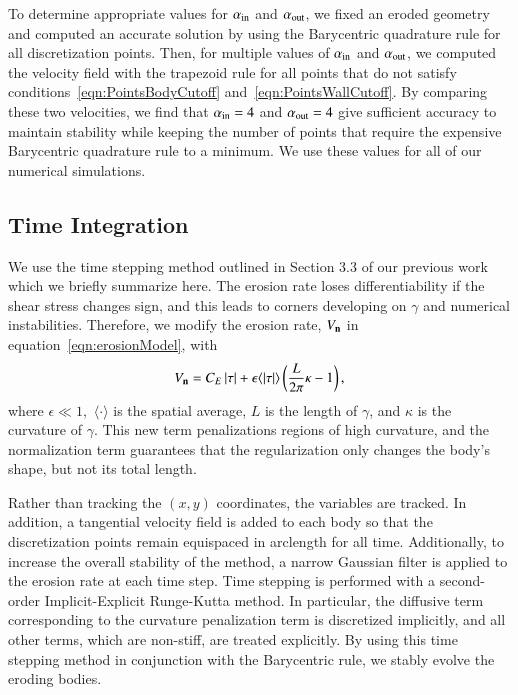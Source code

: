 \documentclass[preprint,10pt]{elsarticle}
\begin{document}
To determine appropriate values for $\alpha_{\mathrm{in}}$ and $\alpha_{\mathrm{out}}$,
we fixed an eroded geometry and computed an accurate solution by using
the Barycentric quadrature rule for all discretization points.  Then,
for multiple values of $\alpha_{\mathrm{in}}$ and $\alpha_{\mathrm{out}}$, we computed the
velocity field with the trapezoid rule for all points that do not
satisfy conditions~\eqref{eqn:PointsBodyCutoff}
and~\eqref{eqn:PointsWallCutoff}.  By comparing these two velocities, we
find that $\alpha_{\mathrm{in}} = 4$ and $\alpha_{\mathrm{out}} = 4$ give sufficient
accuracy to maintain stability while keeping the number of points that
require the expensive Barycentric quadrature rule to a minimum.  We use
these values for all of our numerical simulations.

\subsection{Time Integration}
\label{sec:time}
We use the time stepping method outlined in Section 3.3 of our previous
work~\cite{qua-moo2018} which we briefly summarize here.  The erosion
rate loses differentiability if the shear stress changes sign, and this
leads to corners developing on $\gamma$ and numerical instabilities.
Therefore, we modify the erosion rate, $V_{\mathbf{n}}$ in
equation~\eqref{eqn:erosionModel}, with
\begin{align}
  V_{\mathbf{n}} = C_E \, \lvert \tau \rvert + \epsilon \langle\lvert \tau \rvert\rangle \left(
    \frac{L}{2\pi} \kappa - 1 \right),
\end{align}
where $\epsilon \ll 1,$ $\langle \cdot \rangle$ is the spatial average,
$L$ is the length of $\gamma$, and $\kappa$ is the curvature of
$\gamma$.  This new term penalizations regions of high curvature, and
the normalization term guarantees that the regularization only changes
the body's shape, but not its total length.  

Rather than tracking the $(x,y)$ coordinates, the {\thL} variables are
tracked. In addition, a tangential velocity field is added to each body
so that the discretization points remain equispaced in arclength for all
time.  Additionally, to increase the overall stability of the method, a
narrow Gaussian filter is applied to the erosion rate at each time step.
Time stepping is performed with a second-order Implicit-Explicit
Runge-Kutta method. In particular, the diffusive term corresponding to
the curvature penalization term is discretized implicitly, and all other
terms, which are non-stiff, are treated explicitly.  By using this time
stepping method in conjunction with the Barycentric rule, we stably
evolve the eroding bodies.  
\end{document}
